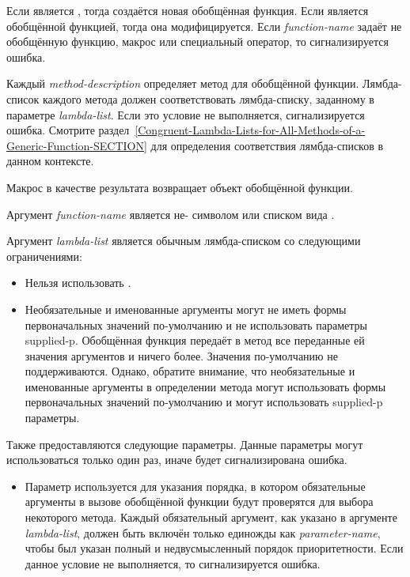 \begin{defmac}
Если  является , тогда создаётся новая
обобщённая функция. Если  является
обобщённой функцией, тогда она модифицируется. Если \emph{function-name} задаёт
не обобщённую функцию, макрос или специальный оператор, то сигнализируется ошибка.

Каждый \emph{method-description} определяет метод для обобщённой функции.
Лямбда-список каждого метода должен соответствовать лямбда-списку, заданному в
параметре \emph{lambda-list}. Если это условие не выполняется, сигнализируется
ошибка.
Смотрите
раздел~\ref{Congruent-Lambda-Lists-for-All-Methods-of-a-Generic-Function-SECTION}
для определения соответствия лямбда-списков в данном контексте.

Макрос  в качестве результата возвращает объект обобщённой
функции.

Аргумент \emph{function-name} является не- символом или списком вида
.

Аргумент \emph{lambda-list} является обычным лямбда-списком со следующими
ограничениями:

\begin{itemize}

\item 
Нельзя использовать .

\item 
Необязательные и именованные аргументы могут не иметь формы первоначальных значений
по-умолчанию и не использовать параметры supplied-p.
Обобщённая функция передаёт в метод все переданные ей значения аргументов и
ничего более. Значения по-умолчанию не поддерживаются.
Однако, обратите внимание, что необязательные и именованные аргументы в
определении метода могут использовать формы первоначальных значений по-умолчанию
и могут использовать supplied-p параметры.
\end{itemize}

Также предоставляются следующие параметры. Данные параметры могут использоваться
только один раз, иначе будет сигнализирована ошибка.
\begin{itemize}

\item 
Параметр  используется для указания порядка, в
котором обязательные аргументы в вызове обобщённой функции будут проверятся для
выбора некоторого метода. Каждый обязательный аргумент, как указано в аргументе
\emph{lambda-list}, должен быть включён только единожды как
\emph{parameter-name}, чтобы был указан полный и недвусмысленный порядок
приоритетности. Если данное условие не выполняется, то сигнализируется ошибка.


\end{itemize}
\end{defmac}
